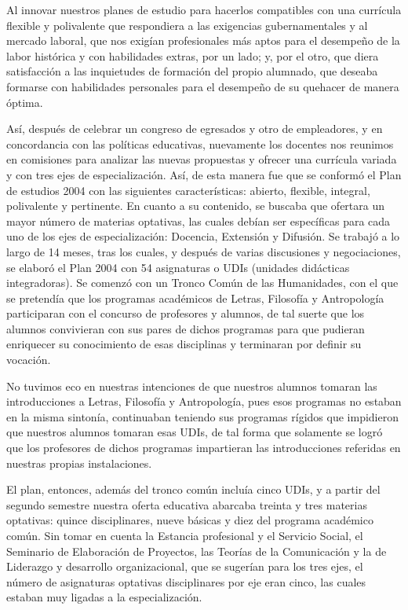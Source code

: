 \enlargethispage{1\baselineskip}
Al innovar nuestros planes de estudio para hacerlos compatibles con una currícula 
flexible y polivalente que respondiera a las exigencias 
gubernamentales y al mercado laboral, que nos exigían profesionales 
más aptos para el desempeño de la labor histórica y con habilidades 
extras, por un lado; y, por el otro, que diera satisfacción a las 
inquietudes de formación del propio alumnado, que deseaba formarse con 
habilidades personales para el desempeño de su quehacer de manera 
óptima.

Así, después de celebrar un congreso de egresados y otro de empleadores, y 
en concordancia con las políticas educativas, nuevamente los docentes nos 
reunimos en comisiones para analizar las nuevas propuestas y ofrecer 
una currícula variada y con tres ejes de especialización. Así, de esta 
manera fue que se conformó el Plan de estudios 2004 con las siguientes 
características: abierto, flexible, integral, polivalente 
y pertinente. En cuanto a su contenido, se buscaba que ofertara un mayor 
número de materias optativas, las cuales debían ser específicas para cada uno de los ejes de 
especialización: Docencia, Extensión y Difusión. Se trabajó a lo largo de 14 
meses, tras los cuales, y después de varias discusiones y negociaciones, se elaboró 
el Plan 2004 con 54 asignaturas o UDIs (unidades 
didácticas integradoras). Se comenzó con un Tronco Común de las 
Humanidades, con el que se pretendía que los programas académicos de Letras, 
Filosofía y Antropología participaran con el concurso de profesores y 
alumnos, de tal suerte que los alumnos convivieran con sus pares de dichos programas 
para que pudieran enriquecer su conocimiento de esas disciplinas y terminaran por 
definir su vocación.

No tuvimos eco en nuestras intenciones de que nuestros alumnos tomaran las 
introducciones a Letras, Filosofía y Antropología, pues esos programas 
no estaban en la misma sintonía, continuaban teniendo sus programas 
rígidos que impidieron que nuestros alumnos tomaran esas UDIs, de tal forma que 
solamente se logró que los profesores de dichos programas impartieran 
las introducciones referidas en nuestras propias instalaciones.

El plan, entonces, además del tronco común incluía cinco UDIs, y a partir 
del segundo semestre nuestra oferta educativa abarcaba treinta y tres 
materias optativas: quince disciplinares, nueve básicas y diez del 
programa académico común. Sin tomar en cuenta la Estancia profesional y el 
Servicio Social, el Seminario de Elaboración de Proyectos, las Teorías de la 
Comunicación y la de Liderazgo y desarrollo organizacional, que se sugerían 
para los tres ejes, el número de asignaturas optativas disciplinares 
por eje eran cinco, las cuales estaban muy ligadas a la especialización.  

